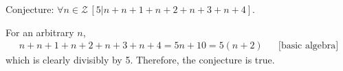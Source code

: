 \documentclass[a5paper]{article}
\begin{document}
Conjecture: $\forall n \in \mathcal{Z}\,[5|n + n+1 + n+2 + n+3 + n+4]$.

For an arbitrary $n$,
\begin{align*}
  n + n + 1 + n + 2 + n + 3 + n + 4 = 5n + 10 = 5(n + 2) && \text{[basic algebra]}
\end{align*}
which is clearly divisibly by 5. Therefore, the conjecture is true.
\end{document}
